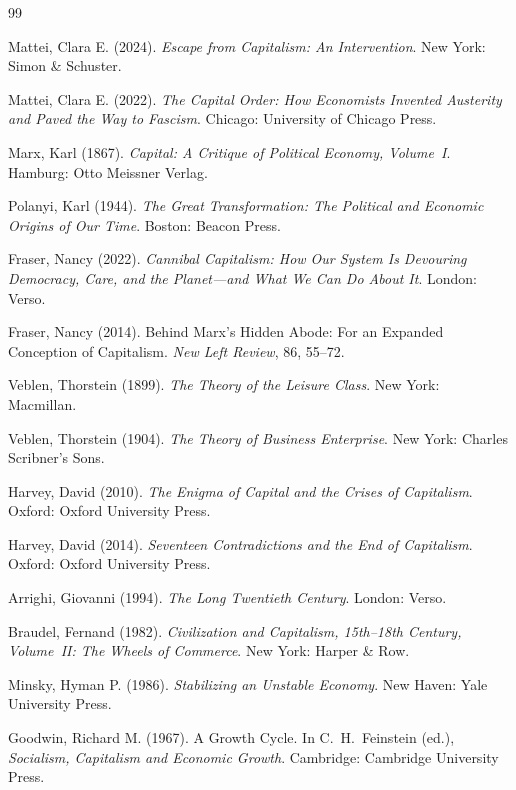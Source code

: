 \documentclass[12pt,a4paper]{article}
\theoremstyle{definition}
\theoremstyle{remark}
\begin{document}
\begin{thebibliography}{99}

Mattei, Clara E. (2024).
\textit{Escape from Capitalism: An Intervention}.
New York: Simon \& Schuster.

Mattei, Clara E. (2022).
\textit{The Capital Order: How Economists Invented Austerity and Paved the Way to Fascism}.
Chicago: University of Chicago Press.

Marx, Karl (1867).
\textit{Capital: A Critique of Political Economy, Volume~I}.
Hamburg: Otto Meissner Verlag.

Polanyi, Karl (1944).
\textit{The Great Transformation: The Political and Economic Origins of Our Time}.
Boston: Beacon Press.

Fraser, Nancy (2022).
\textit{Cannibal Capitalism: How Our System Is Devouring Democracy, Care, and the Planet---and What We Can Do About It}.
London: Verso.

Fraser, Nancy (2014).
Behind Marx's Hidden Abode: For an Expanded Conception of Capitalism.
\textit{New Left Review}, 86, 55--72.

Veblen, Thorstein (1899).
\textit{The Theory of the Leisure Class}.
New York: Macmillan.

Veblen, Thorstein (1904).
\textit{The Theory of Business Enterprise}.
New York: Charles Scribner's Sons.

Harvey, David (2010).
\textit{The Enigma of Capital and the Crises of Capitalism}.
Oxford: Oxford University Press.

Harvey, David (2014).
\textit{Seventeen Contradictions and the End of Capitalism}.
Oxford: Oxford University Press.

Arrighi, Giovanni (1994).
\textit{The Long Twentieth Century}.
London: Verso.

Braudel, Fernand (1982).
\textit{Civilization and Capitalism, 15th--18th Century, Volume~II: The Wheels of Commerce}.
New York: Harper \& Row.

Minsky, Hyman P. (1986).
\textit{Stabilizing an Unstable Economy}.
New Haven: Yale University Press.

Goodwin, Richard M. (1967).
A Growth Cycle.
In C.~H.~Feinstein (ed.), \textit{Socialism, Capitalism and Economic Growth}.
Cambridge: Cambridge University Press.


\end{thebibliography}
\end{document}
